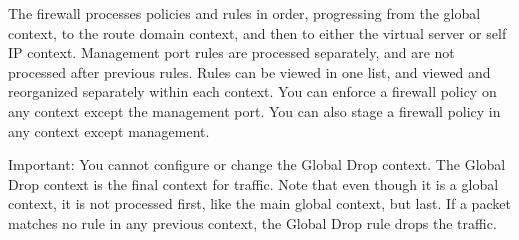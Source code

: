\documentclass[letterpaper,10pt,english]{sphinxmanual}
\begin{document}
The firewall processes policies and rules in order, progressing from the
global context, to the route domain context, and then to either the
virtual server or self IP context. Management port rules are processed
separately, and are not processed after previous rules. Rules can be
viewed in one list, and viewed and reorganized separately within each
context. You can enforce a firewall policy on any context except the
management port. You can also stage a firewall policy in any context
except management.

Important: You cannot configure or change the Global Drop context. The
Global Drop context is the final context for traffic. Note that even
though it is a global context, it is not processed first, like the main
global context, but last. If a packet matches no rule in any previous
context, the Global Drop rule drops the traffic.

\end{document}
